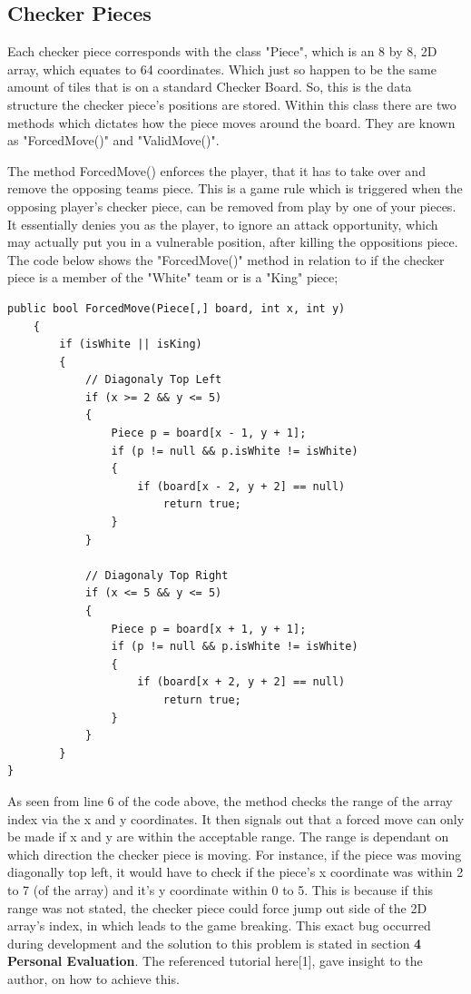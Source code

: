 \documentclass[10pt, a4paper]{article}
\begin{document}
	\subsection{Checker Pieces}
	Each checker piece corresponds with the class "Piece", which is an 8 by 8, 2D array, which equates to 64 coordinates. Which just so happen to be the same amount of tiles that is on a standard Checker Board. So, this is the data structure the checker piece's positions are stored. Within this class there are two methods which dictates how the piece moves around the board. They are known as "ForcedMove()" and "ValidMove()".
	
	The method ForcedMove() enforces the player, that it has to take over and remove the opposing teams piece. This is a game rule which is triggered when the opposing player's checker piece, can be removed from play by one of your pieces. It essentially denies you as the player, to ignore an attack opportunity, which may actually put you in a vulnerable position, after killing the oppositions piece. The code below shows the "ForcedMove()" method in relation to if the checker piece is a member of the "White" team or is a "King" piece;
	\begin{lstlisting}[caption = ForcedMove()]
public bool ForcedMove(Piece[,] board, int x, int y)
    {
        if (isWhite || isKing)
        {
            // Diagonaly Top Left
            if (x >= 2 && y <= 5)
            {
                Piece p = board[x - 1, y + 1];
                if (p != null && p.isWhite != isWhite)
                {
                    if (board[x - 2, y + 2] == null)
                        return true;
                }
            }
            
            // Diagonaly Top Right
            if (x <= 5 && y <= 5)
            {
                Piece p = board[x + 1, y + 1];
                if (p != null && p.isWhite != isWhite)
                {
                    if (board[x + 2, y + 2] == null)
                        return true;
                }
            }
        }
}
	\end{lstlisting}
	
	As seen from line 6 of the code above, the method checks the range of the array index via the x and y coordinates. It then signals out that a forced move can only be made if x and y are within the acceptable range. The range is dependant on which direction the checker piece is moving. For instance, if the piece was moving diagonally top left, it would have to check if the piece's x coordinate was within 2 to 7 (of the array) and it's y coordinate within 0 to 5. This is because if this range was not stated, the checker piece could force jump out side of the 2D array's index, in which leads to the game breaking. This exact bug occurred during development and the solution to this problem is stated in section \textbf{4 Personal Evaluation}. The referenced tutorial here[1], gave insight to the author, on how to achieve this.
	
\end{document}

